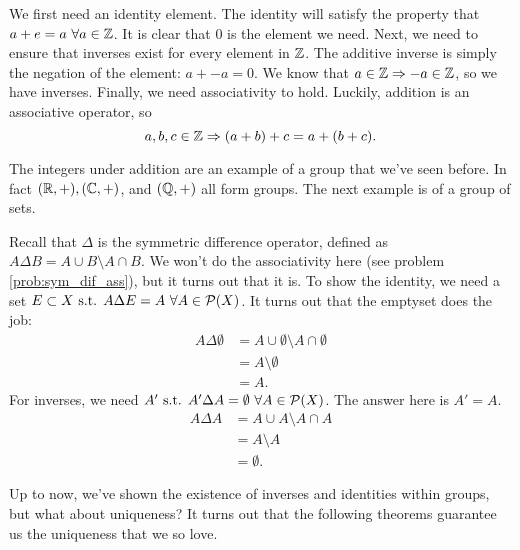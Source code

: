 \begin{example}{}
    We first need an identity element. The identity will satisfy the property that $a+e=a\ \forall a\in\mathbb{Z}$. It is clear that 0 is the element we need.
    Next, we need to ensure that inverses exist for every element in $\mathbb{Z}$. The additive inverse is simply the negation of the element: $a+-a=0$. We know that $a\in\mathbb{Z}\Rightarrow -a\in\mathbb{Z}$, so we have inverses.
    Finally, we need associativity to hold. Luckily, addition is an associative operator, so
    \[
        a,b,c\in\mathbb{Z}\Rightarrow (a+b)+c=a+(b+c).
    \]
\end{example}

The integers under addition are an example of a group that we've seen before. In fact $(\mathbb{R},+), (\mathbb{C},+)$, and $(\mathbb{Q},+)$ all form groups. The next example is of a group of sets.

\begin{example}{}
    Recall that $\Delta$ is the symmetric difference operator, defined as $A\Delta B= A\cup B\setminus A\cap B$. We won't do the associativity here (see problem \ref{prob:sym_dif_ass}), but it turns out that it is. To show the identity, we need a set $E\subset X \text{ s.t. } A\Delta E=A\ \forall A\in\mathcal{P}(X)$. It turns out that the emptyset does the job:
    \begin{align*}
        A\Delta \emptyset &= A\cup\emptyset \setminus A\cap\emptyset\\
        &= A \setminus \emptyset\\
        &= A.
    \end{align*}
    For inverses, we need $A'\text{ s.t. } A'\Delta A=\emptyset\ \forall A\in\mathcal{P}(X)$. The answer here is $A'=A$.
    \begin{align*}
        A \Delta A &= A \cup A \setminus A\cap A\\
        &= A \setminus A\\
        &= \emptyset.
    \end{align*}
\end{example}

Up to now, we've shown the existence of inverses and identities within groups, but what about uniqueness? It turns out that the following theorems guarantee us the uniqueness that we so love.

